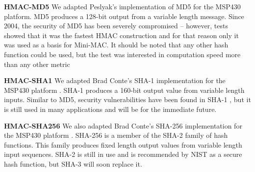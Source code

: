 \textbf{HMAC-MD5}
We adapted Peslyak's implementation of MD5 for the MSP430 platform. MD5 produces a 128-bit output from a variable length message. Since 2004, the security of MD5 has been severely compromised \cite{Wang-MD5} -- however, tests showed that it was the fastest HMAC construction and for that reason only it was used as a basis for Mini-MAC. It should be noted that any other hash function could be used, but the test was interested in computation speed more than any other metric\cite{MD5}


\textbf{HMAC-SHA1}
We adapted Brad Conte's SHA-1 implementation for the MSP430 platform \cite{Conte-SHA1}. SHA-1 produces a 160-bit output value from variable length inputs. Similar to MD5, security vulnerabilities have been found in SHA-1 \cite{Wang-SHA1}, but it is still used in many applications and will be for the immediate future\cite{FIPS-180-4}.

\textbf{HMAC-SHA256}
We also adapted Brad Conte's SHA-256 implementation for the MSP430 platform \cite{Conte-SHA256}. SHA-256 is a member of the SHA-2 family of hash functions. This family produces fixed length output values from variable length input sequences. SHA-2 is still in use and is recommended by NIST as a secure hash function, but SHA-3 will soon replace it\cite{FIPS-180-4}.